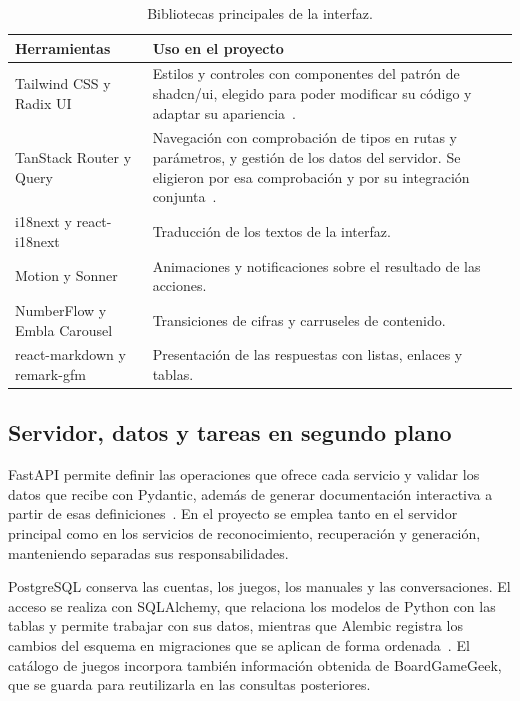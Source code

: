 \begin{table}[htbp]
    \centering
    \small
    \begin{tabular}{@{}>{\raggedright\arraybackslash}p{}>{\raggedright\arraybackslash}p{}@{}}
        \toprule
        \textbf{Herramientas} & \textbf{Uso en el proyecto} \\
        \midrule
        Tailwind CSS y Radix UI & Estilos y controles con componentes del
        patrón de shadcn/ui, elegido para poder modificar su código y
        adaptar su apariencia~\cite{shadcn_componentes}. \\
        \addlinespace
        TanStack Router y Query & Navegación con comprobación de tipos en
        rutas y parámetros, y gestión de los datos del servidor. Se
        eligieron por esa comprobación y por su integración
        conjunta~\cite{tanstack_router}. \\
        \addlinespace
        i18next y react-i18next & Traducción de los textos de la interfaz. \\
        \addlinespace
        Motion y Sonner & Animaciones y notificaciones sobre el resultado
        de las acciones. \\
        \addlinespace
        NumberFlow y Embla Carousel & Transiciones de cifras y carruseles
        de contenido. \\
        \addlinespace
        react-markdown y remark-gfm & Presentación de las respuestas con
        listas, enlaces y tablas. \\
        \bottomrule
    \end{tabular}
    \caption{Bibliotecas principales de la interfaz.}
    \label{tabla:herramientas-interfaz}
\end{table}

\subsection{Servidor, datos y tareas en segundo plano}

FastAPI permite definir las operaciones que ofrece cada servicio y validar
los datos que recibe con Pydantic, además de generar documentación
interactiva a partir de esas definiciones~\cite{fastapi_caracteristicas}.
En el proyecto se emplea tanto en el servidor principal como en los
servicios de reconocimiento, recuperación y generación, manteniendo
separadas sus responsabilidades.

PostgreSQL conserva las cuentas, los juegos, los manuales y las
conversaciones. El acceso se realiza con SQLAlchemy, que relaciona los
modelos de Python con las tablas y permite trabajar con sus datos, mientras
que Alembic registra los cambios del esquema en migraciones que se aplican
de forma ordenada~\cite{sqlalchemy_inicio,alembic_documentacion}.
El catálogo de juegos incorpora también información obtenida de BoardGameGeek,
que se guarda para reutilizarla en las consultas posteriores.

